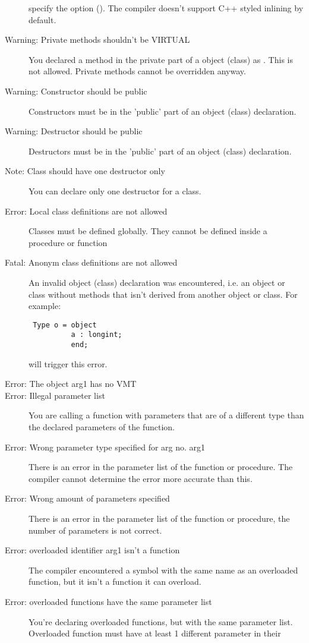 \begin{description}
 specify the  option (). The compiler doesn't support C++
 styled inlining by default.
\item [Warning: Private methods shouldn't be VIRTUAL]
 You declared a method in the private part of a object (class) as
 . This is not allowed. Private methods cannot be overridden
 anyway.
\item [Warning: Constructor should be public]
 Constructors must be in the 'public' part of an object (class) declaration.
\item [Warning: Destructor should be public]
 Destructors must be in the 'public' part of an object (class) declaration.
\item [Note: Class should have one destructor only]
 You can declare only one destructor for a class.
\item [Error: Local class definitions are not allowed]
 Classes must be defined globally. They cannot be defined inside a
 procedure or function
\item [Fatal: Anonym class definitions are not allowed]
 An invalid object (class) declaration was encountered, i.e. an
 object or class without methods that isn't derived from another object or
 class. For example:
 \begin{verbatim}
 Type o = object
          a : longint;
          end;
 \end{verbatim}
 will trigger this error.
\item [Error: The object arg1 has no VMT]
\item [Error: Illegal parameter list]
 You are calling a function with parameters that are of a different type than
 the declared parameters of the function.
\item [Error: Wrong parameter type specified for arg no. arg1]
 There is an error in the parameter list of the function or procedure.
 The compiler cannot determine the error more accurate than this.
\item [Error: Wrong amount of parameters specified]
 There is an error in the parameter list of the function or procedure,
 the number of parameters is not correct.
\item [Error: overloaded identifier arg1 isn't a function]
 The compiler encountered a symbol with the same name as an overloaded
 function, but it isn't a function it can overload.
\item [Error: overloaded functions have the same parameter list]
 You're declaring overloaded functions, but with the same parameter list.
 Overloaded function must have at least 1 different parameter in their

\end{description}

